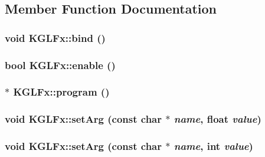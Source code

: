 \subsection{Member Function Documentation}
\hypertarget{class_k_g_l_fx_b96fa94be7e76720b806a098ffb8ee34}{
\subsubsection[{bind}]{\setlength{\rightskip}{0pt plus 5cm}void KGLFx::bind ()}}
\label{class_k_g_l_fx_b96fa94be7e76720b806a098ffb8ee34}


\hypertarget{class_k_g_l_fx_768cebc0d09e441e398ef4a5ac06f28a}{
\subsubsection[{enable}]{\setlength{\rightskip}{0pt plus 5cm}bool KGLFx::enable ()}}
\label{class_k_g_l_fx_768cebc0d09e441e398ef4a5ac06f28a}


\hypertarget{class_k_g_l_fx_c02c704f61750f6eb5b49f48d0a74820}{
\subsubsection[{program}]{$\ast$ KGLFx::program ()}}
\label{class_k_g_l_fx_c02c704f61750f6eb5b49f48d0a74820}


\hypertarget{class_k_g_l_fx_4406ef8524d0e53f64d30f7b6e229bc3}{
\subsubsection[{setArg}]{\setlength{\rightskip}{0pt plus 5cm}void KGLFx::setArg (const char $\ast$ {\em name}, \/  float {\em value})}}
\label{class_k_g_l_fx_4406ef8524d0e53f64d30f7b6e229bc3}


\hypertarget{class_k_g_l_fx_ce266e6c653796d142396ce056ec1b96}{
\subsubsection[{setArg}]{\setlength{\rightskip}{0pt plus 5cm}void KGLFx::setArg (const char $\ast$ {\em name}, \/  int {\em value})}}
\label{class_k_g_l_fx_ce266e6c653796d142396ce056ec1b96}


